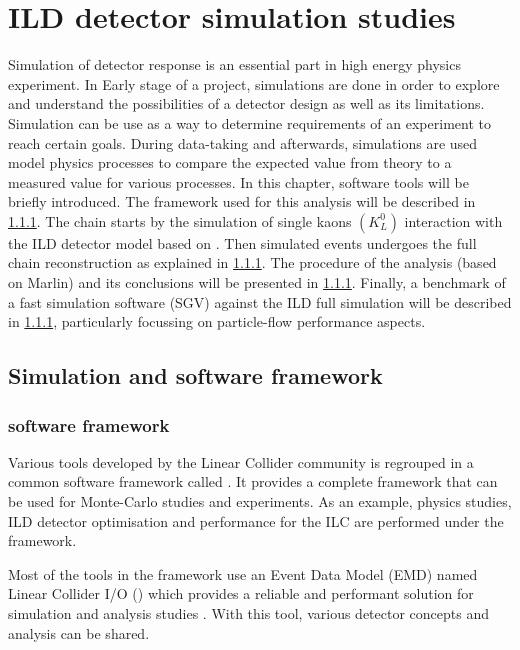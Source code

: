 \chapter{ILD detector simulation studies}

Simulation of detector response is an essential part in high energy physics experiment. In Early stage of a project, simulations are done in order to explore and understand the possibilities of a detector design as well as its limitations. Simulation can be use as a way to determine requirements of an experiment to reach certain goals. During data-taking and afterwards, simulations are used model physics processes to compare  the expected value from theory to a measured value for various processes.
In this chapter, software tools will be briefly introduced. The \ilcsoft framework used for this analysis will be described in \ref{}. The chain starts by the simulation of single kaons $(K^{0}_{L})$ interaction with the ILD detector model based on \geant. Then simulated events undergoes the full chain reconstruction as explained in \ref{}. The procedure of the analysis (based on Marlin) and its conclusions will be presented in \ref{}.
Finally, a benchmark of a fast simulation software (SGV) against the ILD full simulation will be described in \ref{}, particularly focussing on particle-flow performance aspects.

\section{Simulation and software framework}

\subsection{\ilcsoft software framework}

Various tools developed by the Linear Collider community is regrouped in a common software framework called \ilcsoft \cite{ILCSoftPortal}. It provides a complete framework that can be used for Monte-Carlo studies and experiments. As an example, physics studies, ILD detector optimisation and performance for the ILC are performed under the \ilcsoft framework.

Most of the tools in the framework use an Event Data Model (EMD) named Linear Collider I/O (\lcio) which provides a reliable and performant solution for simulation and analysis studies \cite{Gaede:2003ip}. With this tool, various detector concepts and analysis can be shared.

